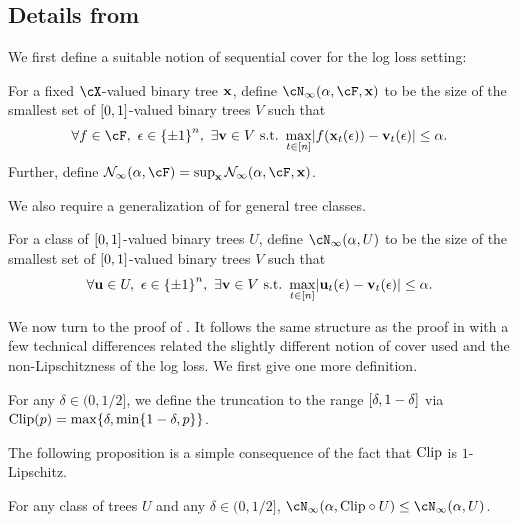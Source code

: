 \subsection{Details from }
\label{app:logloss}

We first define a suitable notion of sequential cover for the log loss setting:
\begin{definition}
  \label{def:cover_real}
  For a fixed $\cX$-valued binary tree $\x$, define $\cN_{\infty}(\alpha, \cF, \x)$ to be the size of the smallest set of $\brk*{0,1}$-valued binary trees $V$ such that
  \[
    \forall f \in \F, ~\eps \in \pmo^{n},  ~\exists \vv \in V ~\textnormal{s.t.}~ \max_{t\in\brk*{n}}\abs*{f(\x_{t}(\eps)) - \vv_{t}(\eps)} \leq{} \alpha.
  \]Further, define $\mathcal{N}_{\infty}(\alpha,\F) = \sup_\x \mathcal{N}_{\infty}(\alpha,\F,\x)$. 
\end{definition}
We also require a generalization of  for general tree classes.
\begin{definition}
  \label{def:cover_real_tree}
  For a class of $\brk*{0,1}$-valued binary trees $U$, define $\cN_{\infty}(\alpha, U)$ to be the size of the smallest set of $\brk*{0,1}$-valued binary trees $V$ such that
  \[
    \forall \uu \in U, ~\eps \in \pmo^{n},  ~\exists \vv \in V ~\textnormal{s.t.}~ \max_{t\in\brk*{n}}\abs*{\uu_{t}(\eps) - \vv_{t}(\eps)} \leq{} \alpha.
  \]
\end{definition}

We now turn to the proof of . It follows the same structure as the proof in  with a few technical differences related the slightly different notion of cover used and the non-Lipschitzness of the log loss. We first give one more definition.

\begin{definition}
  For any $\delta\in(0,1/2]$, we define the truncation to the range $\brk*{\delta, 1-\delta}$ via $\clip(p) = \max\crl*{\delta, \min\crl*{1-\delta, p}}$.
\end{definition}

The following proposition is a simple consequence of the fact that $\clip$ is $1$-Lipschitz.
\begin{proposition}
  \label{prop:clip_covering}
  For any class of trees $U$ and any $\delta\in(0,1/2]$, $\cN_{\infty}(\alpha, \clip\circ{}U)\leq{}\cN_{\infty}(\alpha, U)$.
\end{proposition}

